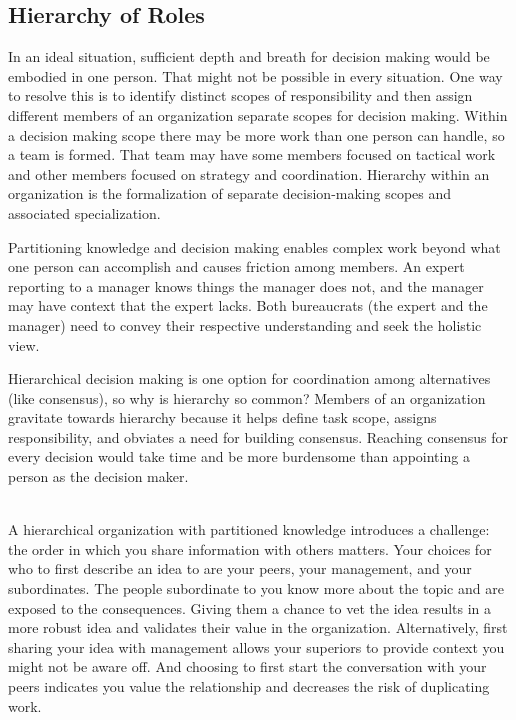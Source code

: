 \subsection*{Hierarchy of Roles\label{sec:hierarchy-of-roles}}


In an ideal situation, sufficient depth and breath for decision making would be embodied in one person. That might not be possible in every situation. One way to resolve this is to identify distinct scopes of responsibility and then assign different members of an organization separate scopes for decision making. Within a decision making scope there may be more work than one person can handle, so a team is formed. That team may have some members focused on tactical work and other members focused on strategy and coordination. Hierarchy within an organization is the formalization of separate decision-making scopes and associated specialization. 

Partitioning knowledge and decision making enables complex work beyond what one person can accomplish and causes friction among members. An expert reporting to a manager knows things the manager does not, and the manager may have context that the expert lacks. Both bureaucrats (the expert and the manager) need to convey their respective understanding and seek the holistic view.

Hierarchical decision making is one option for coordination among alternatives (like consensus), so why is hierarchy so common? Members of an organization gravitate towards hierarchy because it helps define task scope, assigns responsibility, and obviates a need for building consensus. Reaching consensus for every decision would take time and be more burdensome than appointing a person as the decision maker.

\ \\

A hierarchical organization with partitioned knowledge introduces a challenge: the order in which you share information with others matters. Your choices for who to first describe an idea to are your peers, your management, and your subordinates. 
The people subordinate to you know more about the topic and are exposed to the consequences. Giving them a chance to vet the idea results in a more robust idea and validates their value in the organization. Alternatively, first sharing your idea with management  allows your superiors to provide context you might not be aware off. And choosing to first start the conversation with your peers indicates you value the relationship and decreases the risk of duplicating work.

